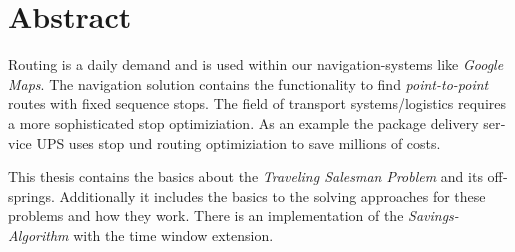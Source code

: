 \chapter{Abstract}

\begin{english} 
Routing is a daily demand and is used within our navigation-systems like \textit{Google Maps}. 
The navigation solution contains the functionality to find \textit{point-to-point} routes with fixed sequence stops. 
The field of transport systems/logistics requires a more sophisticated stop optimiziation. 
As an example the package delivery service UPS uses stop und routing optimiziation to save millions of costs. 

\noindent
This thesis contains the basics about the \textit{Traveling Salesman Problem} and its offsprings. 
Additionally it includes the basics to the solving approaches for these problems and how they work. 
There is an implementation of the \textit{Savings-Algorithm} with the time window extension. 
\end{english}